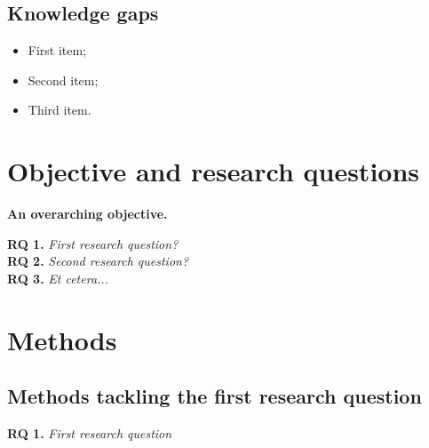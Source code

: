 \documentclass[a4paper,12pt]{article}
\begin{document}
	\subsection{Knowledge gaps}	

     \begin{itemize}
        \item 
        First item;
        \item 
        Second item;
        \item 
        Third item. 
 	\end{itemize}


    \vspace*{5mm}

    \newpage
    \section{Objective and research questions}
    
\begin{tcolorbox}[minipage,colback=Goldenrod,arc=0pt,outer arc=0pt]
\centering
\textbf{An overarching objective.}
\end{tcolorbox}

    \textbf{RQ 1.}	\emph{First research question?}\\
    
    \textbf{RQ 2.}	\emph{Second research question?}\\
    
    \textbf{RQ 3.}	\emph{Et cetera...}\\

    \newpage
    \section{Methods}
	\subsection{Methods tackling the first research question}
	
	\vspace*{10mm}
	
\begin{tcolorbox}[minipage,colback=columbiablue,arc=10pt,outer arc=10pt]
\centering
\textbf{RQ 1.}	\emph{First research question}
\end{tcolorbox}

    \vspace*{10mm}
\end{document}
